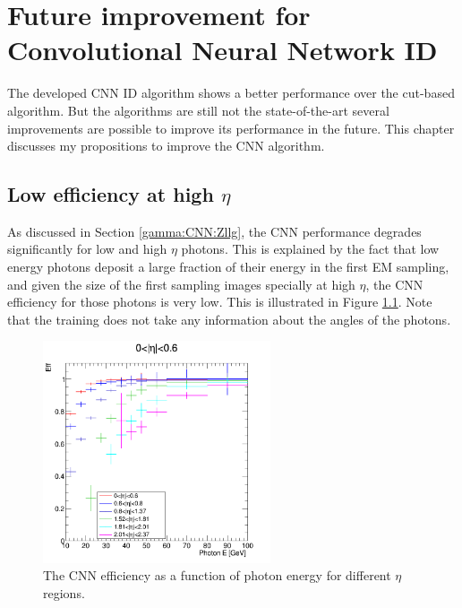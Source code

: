 \chapter{Future improvement for Convolutional Neural Network ID}
\label{Adx3}
The developed CNN ID algorithm shows a better performance over the cut-based algorithm. But the algorithms are still not the state-of-the-art several improvements are possible to improve its performance in the future. This chapter discusses my propositions to improve the CNN algorithm.

\section{Low efficiency at high $\eta$}
\label{Adx3:Eta}

As discussed in Section \ref{gamma:CNN:Zllg}, the CNN performance degrades significantly for low \pT and high $\eta$ photons. This is explained by the fact that low energy photons deposit a large fraction of their energy in the first EM sampling, and given the size of the first sampling images specially at high $\eta$, the CNN efficiency for those photons is very low. This is illustrated in Figure \ref{fig:Adx3:Eta}. Note that the training does not take any information about the angles of the photons.
\begin{figure}[htbp]
    \centering
    \includegraphics[width=0.6\textwidth]{Adx/Adx3/Img/Eff_vs_Energy.png}
    \begin{tcolorbox}[colback=black!5!white,colframe=white!75!black]
    \caption{The CNN efficiency as a function of photon energy for different $\eta$ regions. }
    \label{fig:Adx3:Eta}
    \end{tcolorbox}
    
\end{figure}

